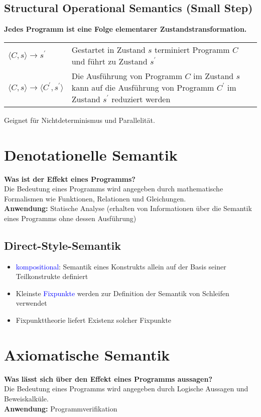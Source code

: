 \documentclass{scrreprt}
\theoremstyle{definition}
\theoremstyle{example}
\theoremstyle{algorithm}
\begin{document}
\subsection{Structural Operational Semantics (Small Step)}
\textbf{\textsf{Jedes Programm ist eine Folge elementarer Zustandstransformation.}}\\
\begin{tabularx}{\linewidth}{lX}
$\langle C,s\rangle\rightarrow s^\prime$&Gestartet in Zustand $s$ terminiert Programm $C$ und führt zu Zustand $s^\prime$\\
$\langle C,s\rangle\rightarrow \langle C^\prime,s^\prime\rangle$&Die Ausführung von Programm $C$ im Zustand $s$ kann auf die Ausführung von Programm $C^\prime$ im Zustand $s^\prime$ reduziert werden\\
\end{tabularx}
Geignet für Nichtdeterminismus und Parallelität.

\section{Denotationelle Semantik}
\textbf{\textsf{Was ist der Effekt eines Programms?}}\\
Die Bedeutung eines Programms wird angegeben durch mathematische Formalismen wie Funktionen, Relationen und Gleichungen.\\
\textbf{Anwendung:} Statische Analyse (erhalten von Informationen über die Semantik eines Programms ohne dessen Ausführung)

\subsection{Direct-Style-Semantik}
\begin{itemize}
\item
\textcolor{blue}{kompositional}: Semantik eines Konstrukts allein auf der Basis seiner Teilkonstrukte definiert
\item
Kleinste \textcolor{blue}{Fixpunkte} werden zur Definition der Semantik von Schleifen verwendet
\item
Fixpunkttheorie liefert Existenz solcher Fixpunkte
\end{itemize}

\section{Axiomatische Semantik}
\textbf{\textsf{Was lässt sich über den Effekt eines Programms aussagen?}}\\
Die Bedeutung eines Programms wird angegeben durch Logische Aussagen und Beweiskalküle.\\
\textbf{Anwendung:} Programmverifikation
\end{document}
